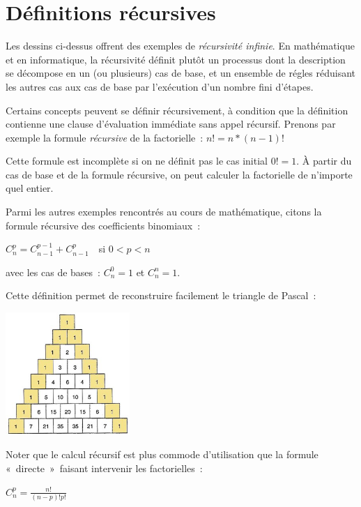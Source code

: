 \section{Définitions récursives}

	Les dessins ci-dessus offrent des exemples de \textit{récursivité infinie}. 
	En mathématique et en informatique, la récursivité définit plutôt un 
	processus dont la description se décompose en un (ou plusieurs) cas de base, 
	et un	ensemble de régles réduisant les autres cas aux cas de base 
	par l'exécution d'un nombre fini d'étapes.

	Certains concepts peuvent se définir récursivement, 
	à condition que la définition contienne une clause d'évaluation
	immédiate sans appel récursif. Prenons par exemple la formule 
	\textit{récursive} de la factorielle~: 
	$n! = n*(n-1)!$

	Cette formule est incomplète si on ne définit pas le cas initial 
	$0! = 1$. À partir du cas de base et de la formule
	récursive, on peut calculer la factorielle de n'importe quel entier.

	Parmi les autres exemples rencontrés au cours de mathématique, 
	citons la formule récursive des coefficients binomiaux~:


	{\centering
	 $C_n^p=C_{n-1}^{p-1}+C_{n-1}^p$\ \ si $0<p<n$
	\par}

	avec les cas de bases~: $C_n^0=1$ et $C_n^n=1$. 
	
	Cette définition permet de reconstruire facilement le triangle de Pascal~:

	\begin{center}
	\includegraphics[width=4.724cm,height=4.651cm]{image/a2012Logique2eme-img019.jpg}
	\end{center}

	Noter que le calcul récursif est plus commode d'utilisation 
	que la formule «~directe~»~faisant intervenir les
	factorielles~:

	{\centering
	$C_n^p=\frac{n!}{(n-p)!p!}$
	\par}
	
